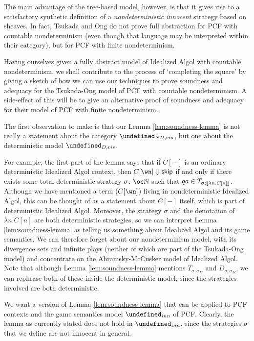 \documentclass[sigplan,10pt,review]{acmart}\settopmatter{printfolios=true,printccs=false,printacmref=false}
\let\G\undefined
\begin{document}
The main advantage of the tree-based model, however, is that it gives rise to a satisfactory synthetic definition of a \emph{nondeterministic innocent} strategy based on sheaves.  
In fact, Tsukada and Ong do not prove full abstraction for PCF with countable nondeterminism (even though that language may be interpreted within their category), but for PCF with finite nondeterminism.  

Having ourselves given a fully abstract model of Idealized Algol with countable nondeterminism, we shall contribute to the process of `completing the square' by giving a sketch of how we can use our techniques to prove soundness and adequacy for the Tsukada-Ong model of PCF with countable nondeterminism.  
A side-effect of this will be to give an alternative proof of soundness and adequacy for their model of PCF with finite nondeterminism.  

The first observation to make is that our Lemma \ref{lem:soundness-lemma} is not really a statement about the category $\G_{ND,vis}$, but one about the deterministic model $\G_{D,vis}$.  

For example, the first part of the lemma says that if $C[-]$ is an ordinary deterministic Idealized Algol context, then $C[\wn]\converges\skipp$ if and only if there exists some total deterministic strategy $\sigma\from\oc\bN$ such that $qa\in T_{\sigma;\left\llbracket\lambda n.C[n]\right\rrbracket}$.  
Although we have mentioned a term ($C[\wn]$) living in nondeterministic Idealized Algol, this can be thought of as a statement about $C[-]$ itself, which is part of deterministic Idealized Algol.  
Moreover, the strategy $\sigma$ and the denotation of $\lambda n.C[n]$ are both deterministic strategies, so we can interpret Lemma \ref{lem:soundness-lemma} as telling us something about Idealized Algol and its game semantics.  
We can therefore forget about our nondeterminism model, with its divergence sets and infinite plays (neither of which are part of the Tsukada-Ong model) and concentrate on the Abramsky-McCusker model of Idealized Algol.
Note that although Lemma \ref{lem:soundness-lemma} mentions $T_{\sigma;\sigma_M}$ and $D_{\sigma;\sigma_M}$, we can rephrase both of these inside the deterministic model, since the strategies involved are both deterministic.  

We want a version of Lemma \ref{lem:soundness-lemma} that can be applied to PCF contexts and the game semantics model $\G_{inn}$ of PCF.  
Clearly, the lemma as currently stated does not hold in $\G_{inn}$, since the strategies $\sigma$ that we define are not innocent in general.  
\end{document}
